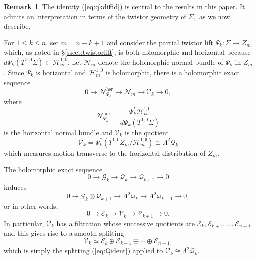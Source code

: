 \documentclass[11pt]{article}
\theoremstyle{definition}
\newtheorem{rmk}[theorem]{Remark}
\numberwithin{equation}{section}
\begin{document}
\begin{rmk}\label{rmk:twistorinterpret}
	The identity (\ref{eq:qkdiffid}) is central to the results in this paper. It admits an interpretation in terms of the twistor geometry of $\Sigma,$ as we now describe.
			
	For $1\leq k\leq n$, set $m=n-k+1$ and consider the partial twistor lift $\Psi_k:\Sigma \to Z_m$ which, as noted in \S\ref{ssect:twistorlift}, is both holomorphic and
	horizontal because $d\Psi_k(T^{1,0}\Sigma)	\subset	\mathcal H_m^{1,0}$. Let $\mathcal N_m$ denote the holomorphic normal bundle of $\Psi_k$ in $Z_m$. Since $\Psi_k$ is horizontal and $\mathcal H_m^{1,0}$ is holomorphic,	there is a holomorphic exact sequence
	\begin{equation*}
		0 \longrightarrow \mathcal N_{\Psi_k}^{\mathrm{hor}} \longrightarrow \mathcal N_m \longrightarrow \mathcal V_k	\longrightarrow 0,
	\end{equation*}
	where
	\begin{equation*}
		\mathcal N_{\Psi_k}^{\mathrm{hor}} = \frac{\Psi_k^*\mathcal H_m^{1,0}}{d\Psi_k(T^{1,0}\Sigma)}
	\end{equation*}
	is the horizontal normal bundle and $\mathcal{V}_k$ is the quotient
	\begin{equation*}
		\mathcal V_k = \Psi_k^*\left(T^{1,0}Z_m/\mathcal H_m^{1,0}\right) \cong	\Lambda^2\mathcal Q_k
	\end{equation*}
	which measures motion transverse to the horizontal distribution of $Z_m$.
			
	The holomorphic exact sequence
	\begin{equation*}
		0 \longrightarrow \mathcal G_k \longrightarrow \mathcal Q_k \longrightarrow \mathcal Q_{k+1} \longrightarrow 0
	\end{equation*}
	induces
	\begin{equation*}
		0 \longrightarrow \mathcal G_k\otimes\mathcal Q_{k+1}	\longrightarrow	\Lambda^2\mathcal Q_k	\longrightarrow	\Lambda^2\mathcal Q_{k+1}	\longrightarrow 0,
	\end{equation*}
	or in other words,
	\begin{equation*}
		0 \longrightarrow \mathcal E_k \longrightarrow \mathcal V_k	\longrightarrow	\mathcal V_{k+1} \longrightarrow 0.
	\end{equation*}
	In particular, $\mathcal V_k$ has a filtration whose successive quotients are $\mathcal E_k,\mathcal E_{k+1},\ldots,\mathcal E_{n-1}$ and this gives rise to a smooth splitting
	\begin{equation}\label{eq:Vident}
		\mathcal{V}_k \simeq \mathcal E_k \oplus \mathcal E_{k+1} \oplus \cdots \oplus \mathcal E_{n-1},
	\end{equation}
	which is simply the splitting (\ref{eq:Qident}) applied to $\mathcal{V}_k \cong \Lambda^2 \mathcal{Q}_k.$
			

\end{rmk}
\end{document}
